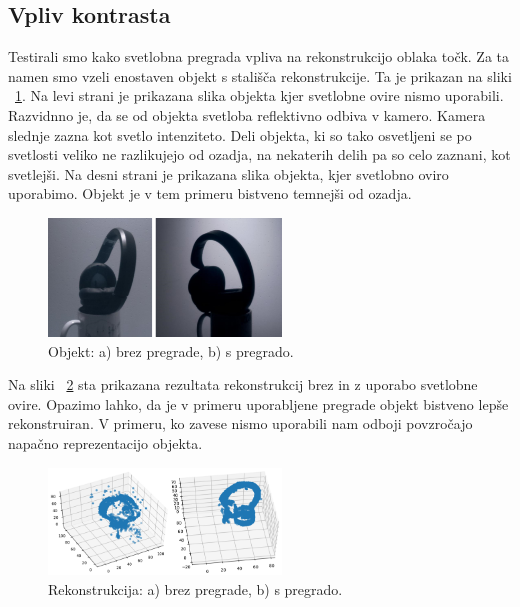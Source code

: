 \documentclass[journal,a4paper,twoside]{sty/IEEEtran}
\begin{document}
\subsection{Vpliv kontrasta}
Testirali smo kako svetlobna pregrada vpliva na rekonstrukcijo oblaka točk. Za ta namen smo vzeli enostaven objekt s stališča rekonstrukcije. Ta je prikazan na sliki ~\ref{fig:slusalkEE}. Na levi strani je prikazana slika objekta kjer svetlobne ovire nismo uporabili. Razvidnno je, da se od objekta svetloba reflektivno odbiva v kamero. Kamera slednje zazna kot svetlo intenziteto. Deli objekta, ki so tako osvetljeni se po svetlosti veliko ne razlikujejo od ozadja, na nekaterih delih pa so celo zaznani, kot svetlejši. Na desni strani je prikazana slika objekta, kjer svetlobno oviro uporabimo. Objekt je v tem primeru bistveno temnejši od ozadja.

\begin{figure}[H]
	\centerline{\includegraphics[width=6.2cm]{fig/slusalke_1}}
	\caption{Objekt: a) brez pregrade, b) s pregrado.}
	\label{fig:slusalkEE}
\end{figure}

Na sliki ~\ref{fig:slusalke} sta prikazana rezultata rekonstrukcij brez in z uporabo svetlobne ovire. Opazimo lahko, da je v primeru uporabljene pregrade objekt bistveno lepše rekonstruiran. V primeru, ko zavese nismo uporabili nam odboji povzročajo napačno reprezentacijo objekta.



\begin{figure}[H]
	\centerline{\includegraphics[width=6.2cm]{fig/slusalke}}
	\caption{Rekonstrukcija: a) brez pregrade, b) s pregrado.}
	\label{fig:slusalke}
\end{figure}
\end{document}
